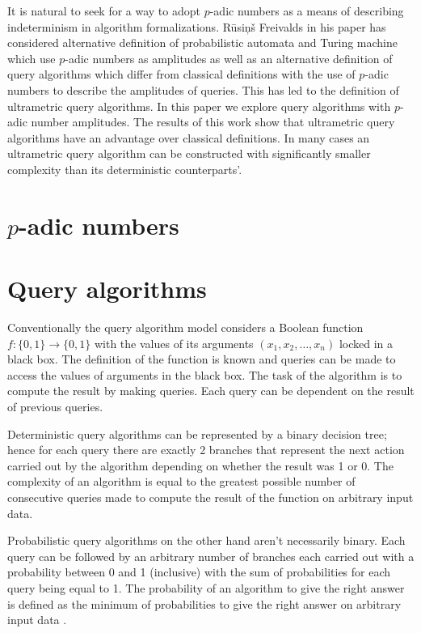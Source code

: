 \documentclass{llncs}
\begin{document}
It is natural to seek for a way to adopt $p$-adic  numbers as a means of describing indeterminism in algorithm formalizations. Rūsiņš Freivalds in his paper \cite{Rus12} has considered alternative definition of probabilistic automata and Turing machine which use $p$-adic numbers as amplitudes as well as an alternative definition of query algorithms which differ from classical definitions with the use of $p$-adic numbers to describe the amplitudes of queries. This has led to the definition of ultrametric query algorithms.
In this paper we explore query algorithms with $p$-adic number amplitudes. The results of this work show that ultrametric query algorithms have an advantage over classical definitions. In many cases an ultrametric query algorithm can be constructed with significantly smaller complexity than its deterministic counterparts'.

\section{$p$-adic numbers}

\section{Query algorithms}
Conventionally the query algorithm model considers a Boolean function $f:\{0,1\}\rightarrow\{0,1\}$ with the values of its arguments $(x_1,x_2,\ldots,x_n)$ locked in a black box. The definition of the function is known and queries can be made to access the values of arguments in the black box. The task of the algorithm is to compute the result by making queries. Each query can be dependent on the result of previous queries.

Deterministic query algorithms can be represented by a binary decision tree; hence for each query there are exactly 2 branches that represent the next action carried out by the algorithm depending on whether the result was 1 or 0. The complexity of an algorithm is equal to the greatest possible number of consecutive queries made to compute the result of the function on arbitrary input data.

Probabilistic query algorithms on the other hand aren't necessarily binary. Each query can be followed by an arbitrary number of branches each carried out with a probability between 0 and 1 (inclusive) with the sum of probabilities for each query being equal to 1. The probability of an algorithm to give the right answer is defined as the minimum of probabilities to give the right answer on arbitrary input data \cite{Buh02} \cite{Vas10}.
\end{document}
